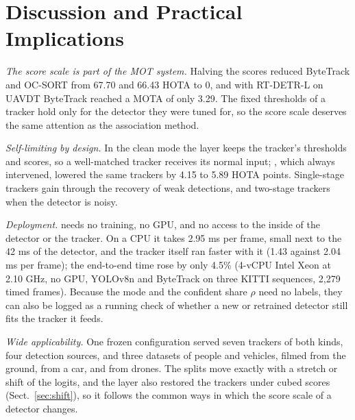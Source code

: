 \section{Discussion and Practical Implications}\label{sec:discussion}

\emph{The score scale is part of the MOT system.} Halving the scores reduced ByteTrack and OC-SORT
from 67.70 and 66.43 HOTA to 0, and with RT-DETR-L on UAVDT ByteTrack reached a MOTA of only 3.29.
The fixed thresholds of a tracker hold only for the detector they were tuned for, so the score
scale deserves the same attention as the association method.

\emph{Self-limiting by design.} In the clean mode the layer keeps the tracker's thresholds and
scores, so a well-matched tracker receives its normal input; \aob{}, which always intervened,
lowered the same trackers by 4.15 to 5.89 HOTA points. Single-stage trackers gain through the
recovery of weak detections, and two-stage trackers when the detector is noisy.

\emph{Deployment.} \scl{} needs no training, no GPU, and no access to the inside of the detector or
the tracker. On a CPU it takes 2.95 ms per frame, small next to the 42 ms of the detector, and the
tracker itself ran faster with it (1.43 against 2.04 ms per frame); the end-to-end time rose by
only 4.5\% (4-vCPU Intel Xeon at 2.10 GHz, no GPU, YOLOv8n and ByteTrack on three KITTI sequences,
2,279 timed frames). Because the mode and the confident share
$\rho$ need no labels, they can also be logged as a running check of whether a new or retrained
detector still fits the tracker it feeds.

\emph{Wide applicability.} One frozen configuration served seven trackers of both kinds, four
detection sources, and three datasets of people and vehicles, filmed from the ground, from a car,
and from drones. The splits move exactly with a stretch or shift of the logits, and the layer also
restored the trackers under cubed scores (Sect.~\ref{sec:shift}), so it follows the common ways in
which the score scale of a detector changes.
